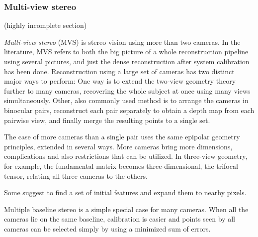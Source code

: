 
\subsubsection{Multi-view stereo} %


(highly incomplete section)



\emph{Multi-view stereo} (MVS) is stereo vision using more than two cameras.
In the literature, MVS refers to both the big picture of a whole reconstruction pipeline using several pictures, and just the dense reconstruction after system calibration has been done.
Reconstruction using a large set of cameras has two distinct major ways to perform:
One way is to extend the two-view geometry theory further to many cameras, recovering the whole subject at once using many views simultaneously.
Other, also commonly used method is to arrange the cameras in binocular pairs, reconstruct each pair separately to obtain a depth map from each pairwise view, and finally merge the resulting points to a single set. \cite{bradley2010high}


The case of more cameras than a single pair uses the same epipolar geometry principles, extended in several ways.
More cameras bring more dimensions, complications and also restrictions that can be utilized.
In three-view geometry, for example, the fundamental matrix becomes three-dimensional, the trifocal tensor, relating all three cameras to the others. \cite{hartley03multiview}

Some suggest to find a set of initial features and expand them to nearby pixels. \cite{furukawa2010accurate, regiongrowingtodo}

Multiple baseline stereo is a simple special case for many cameras. When all the cameras lie on the same baseline, calibration is easier and points seen by all cameras can be selected simply by using a minimized sum of errors. \cite{okutomi1993multiple}

